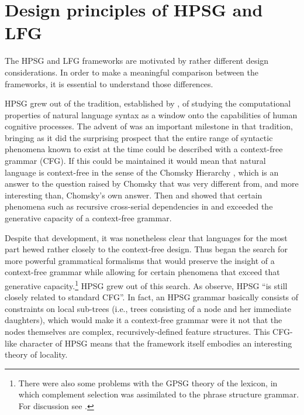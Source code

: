 \section{Design principles of HPSG and LFG} 
\label{design-sec}
The HPSG and LFG  frameworks are motivated by rather different design considerations.  In order to make a meaningful comparison between the frameworks, it is essential to understand those differences.  

HPSG grew out of the tradition, established by \citet{Chomsky57a}, of studying the computational properties of natural language syntax as a window onto the capabilities of human cognitive processes.  The advent of  \citep{GKPS85a} was an important milestone in that tradition, bringing as it did the surprising prospect that the entire range of syntactic phenomena known to exist at the time could be described with a context-free grammar (CFG).  If this could be maintained it would mean that natural language is context-free in the sense of the Chomsky Hierarchy \citep{Chomsky57a}, which is an answer to the question raised by Chomsky that was very different from, and more interesting than, Chomsky's own answer.  Then  \citet{Shieber85a} and \citet{Culy85a} showed that certain phenomena such as recursive cross-serial dependencies in  and  exceeded the generative capacity of a context-free grammar.   


Despite that development, it was nonetheless clear that languages for the most part hewed rather closely to the context-free design.  Thus began the search for more powerful grammatical formalisms that would preserve the insight of a context-free grammar while allowing for certain phenomena that exceed that generative capacity.\footnote{There were also some problems with the GPSG theory of the lexicon, in which complement selection was assimilated to the phrase structure grammar.  For discussion see \citet[Section 4.1]{MWArgSt}.}  HPSG grew out of this search. As  \citet[83]{SWB2003a} observe, HPSG ``is still  closely related to standard CFG''.  In fact, an HPSG grammar basically consists of constraints on local sub-trees (i.e., trees consisting of a node and her immediate daughters), which would make it a context-free grammar were it not that the nodes themselves are complex, recursively-defined feature structures.   This CFG-like character of HPSG means that the framework itself embodies an interesting theory of locality.    

